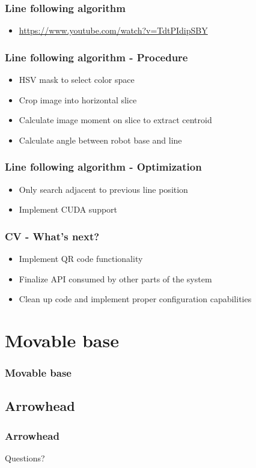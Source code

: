 \documentclass{beamer}
\begin{document}
\begin{frame}
    \frametitle{Line following algorithm}
    \begin{itemize}
	    \item \url{https://www.youtube.com/watch?v=TdtPIdipSBY}
    \end{itemize}
\end{frame}
\begin{frame}
    \frametitle{Line following algorithm - Procedure}
    \begin{itemize}
	    \item HSV mask to select color space
        \item Crop image into horizontal slice
        \item Calculate image moment on slice to extract centroid
        \item Calculate angle between robot base and line
    \end{itemize}
\end{frame}
\begin{frame}
    \frametitle{Line following algorithm - Optimization}
    \begin{itemize}
	    \item Only search adjacent to previous line position
        \item Implement CUDA support
    \end{itemize}
\end{frame}
\begin{frame}
    \frametitle{CV - What's next?}
    \begin{itemize}
	    \item Implement QR code functionality
        \item Finalize API consumed by other parts of the system
        \item Clean up code and implement proper configuration capabilities
    \end{itemize}
\end{frame}
\section{Movable base}
\begin{frame}
    \frametitle{Movable base}
\end{frame}

\subsection{Arrowhead}

\begin{frame}
    \frametitle{Arrowhead}
\end{frame}

\begin{frame}
    \begin{center}
        \Huge Questions?
    \end{center}
\end{frame}
\end{document}
